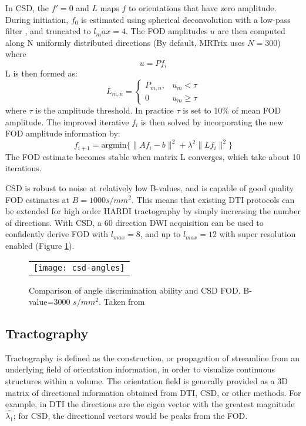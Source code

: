 In CSD, the $f'=0$ and $L$ maps $f$ to orientations that have zero amplitude. During initiation, $f_0$ is estimated using spherical deconvolution with a low-pass filter \cite{Tournier2004}, and truncated to $l_max = 4$. The FOD amplitudes $u$ are then computed along N uniformly distributed directions (By default, MRTrix uses $N=300$) where
\begin{equation}
u = P f_i
\end{equation}
L is then formed as:
\begin{equation}
L_{m,n} = 
	\begin{cases}
		P_{m,n}, & u_m < \tau \\
		0 &	u_m \geq \tau 
	\end{cases}
\end{equation}
where $\tau$ is the amplitude threshold. In practice $\tau$ is set to 10\% of mean FOD amplitude. 
The improved iterative $f_i$ is then solved by incorporating the new FOD amplitude information by:
\begin{equation}
f_{i+1} = \text{argmin}\{ \|Af_i - b\|^2 + \lambda^2 \|L f_i\|^2  \}
\end{equation}
The FOD estimate becomes stable when matrix L converges, which take about 10 iterations. 

CSD is robust to noise at relatively low B-values, and is capable of good quality FOD estimates at $B=1000 s/mm^2$. This means that existing DTI protocols can be extended for high order HARDI tractography by simply increasing the number of directions. With CSD, a 60 direction DWI acquisition can be used to confidently derive FOD with $l_{max}=8 $, and up to $l_{max}=12$ with super resolution enabled \cite{Tournier2007b} (Figure \ref{fig:csd}). 

\begin{figure}[ht]
\begin{center}
\begin{tabular}{c}
\texttt{[image: csd-angles]}
\end{tabular}
\caption{ Comparison of angle discrimination ability and CSD FOD. B-value=3000 \protect $s/mm^2$. Taken from \protect \cite{Tournier2007b} } 
\label{fig:csd}
\end{center}
\end{figure}

\subsection{Tractography}
Tractography is defined as the construction, or propagation of streamline from an underlying field of orientation information, in order to visualize continuous structures within a volume.  The orientation field is generally provided as a 3D matrix of directional information obtained from DTI, CSD, or other methods. For example, in DTI the directions are the eigen vector with the greatest magnitude $\hat{\lambda_1}$; for CSD, the directional vectors would be peaks from the FOD. 

